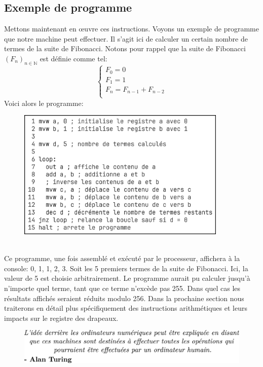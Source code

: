 \documentclass{article}
\begin{document}
\subsection{Exemple de programme}
Mettons maintenant en œuvre ces instructions.
Voyons un exemple de programme que notre machine peut effectuer. Il s'agit ici de calculer un certain nombre de termes de la suite de Fibonacci. Notons pour rappel que la suite de Fibonacci $(F_n)_{n\in\mathbb{N}}$ est définie comme tel:
$$
\begin{cases}
F_0 = 0\\
F_1 = 1\\
F_n = F_{n-1} + F_{n-2}\\
\end{cases}
$$
Voici alors le programme:
\begin{figure}[htp]
    \includegraphics[width=10cm]{images/program.png}
    \label{fig:program}
\end{figure}
\\
Ce programme, une fois assemblé et exécuté par le processeur, affichera à la console: 0, 1, 1, 2, 3. Soit les 5 premiers termes de la suite de Fibonacci.
Ici, la valeur de 5 est choisie arbitrairement. Le programme aurait pu calculer jusqu'à n'importe quel terme, tant que ce terme n'excède pas 255. Dans quel cas les résultats affichés seraient réduits modulo 256. Dans la prochaine section nous traiterons en détail plus spécifiquement des instructions arithmétiques et leurs impacts sur le registre des drapeaux.
\vspace{2cm}
\begin{figure}[htp]
    \centering
    \includegraphics[width=12cm]{images/quote.png}
    \label{fig:quote}
\end{figure}
\newpage
\end{document}
